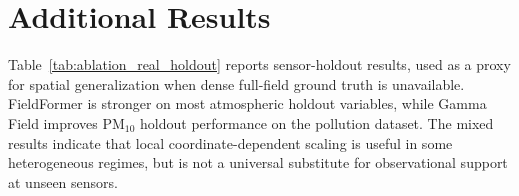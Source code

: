 
\section{Additional Results}

Table~\ref{tab:ablation_real_holdout} reports sensor-holdout results, used as a proxy for spatial generalization when dense full-field ground truth is unavailable. FieldFormer is stronger on most atmospheric holdout variables, while Gamma Field improves PM$_{10}$ holdout performance on the pollution dataset. The mixed results indicate that local coordinate-dependent scaling is useful in some heterogeneous regimes, but is not a universal substitute for observational support at unseen sensors.

